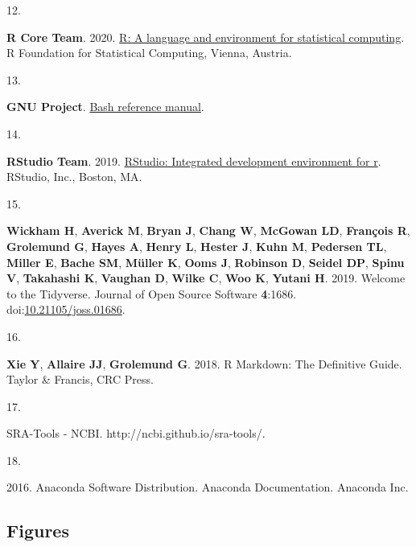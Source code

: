 \documentclass[
]{article}
\newlength{\cslhangindent}
\newlength{\csllabelwidth}
\newlength{\cslentryspacingunit} %
\newenvironment{CSLReferences}[2] %
 {%
  \setlength{\parindent}{0pt}
  \ifodd #1
  \let\oldpar\par
  \def\par{\hangindent=\cslhangindent\oldpar}
  \fi
  \setlength{\parskip}{#2\cslentryspacingunit}
 }%
 {}
\newcommand{\CSLLeftMargin}[1]{\parbox[t]{\csllabelwidth}{#1}}
\newcommand{\CSLRightInline}[1]{\parbox[t]{\linewidth - \csllabelwidth}{#1}\break}
\begin{document}
\begin{CSLReferences}{0}{1}
\leavevmode{}%
\CSLLeftMargin{12. }
\CSLRightInline{\textbf{R Core Team}. 2020.
\href{https://www.R-project.org/}{R: A language and environment for
statistical computing}. R Foundation for Statistical Computing, Vienna,
Austria.}

\leavevmode{}%
\CSLLeftMargin{13. }
\CSLRightInline{\textbf{GNU Project}.
\href{https://www.gnu.org/software/bash/\%20manual/bash.html/}{Bash
reference manual}.}

\leavevmode{}%
\CSLLeftMargin{14. }
\CSLRightInline{\textbf{RStudio Team}. 2019.
\href{http://www.rstudio.com/}{RStudio: Integrated development
environment for r}. RStudio, Inc., Boston, MA.}

\leavevmode{}%
\CSLLeftMargin{15. }
\CSLRightInline{\textbf{Wickham H}, \textbf{Averick M}, \textbf{Bryan
J}, \textbf{Chang W}, \textbf{McGowan LD}, \textbf{François R},
\textbf{Grolemund G}, \textbf{Hayes A}, \textbf{Henry L}, \textbf{Hester
J}, \textbf{Kuhn M}, \textbf{Pedersen TL}, \textbf{Miller E},
\textbf{Bache SM}, \textbf{Müller K}, \textbf{Ooms J}, \textbf{Robinson
D}, \textbf{Seidel DP}, \textbf{Spinu V}, \textbf{Takahashi K},
\textbf{Vaughan D}, \textbf{Wilke C}, \textbf{Woo K}, \textbf{Yutani H}.
2019. Welcome to the Tidyverse. Journal of Open Source Software
\textbf{4}:1686.
doi:\href{https://doi.org/10.21105/joss.01686}{10.21105/joss.01686}.}

\leavevmode{}%
\CSLLeftMargin{16. }
\CSLRightInline{\textbf{Xie Y}, \textbf{Allaire JJ}, \textbf{Grolemund
G}. 2018. R {Markdown}: {The Definitive Guide}. {Taylor \& Francis, CRC
Press}.}

\leavevmode{}%
\CSLLeftMargin{17. }
\CSLRightInline{{SRA}-{Tools} - {NCBI}.
http://ncbi.github.io/sra-tools/.}

\leavevmode{}%
\CSLLeftMargin{18. }
\CSLRightInline{2016. Anaconda {Software Distribution}. Anaconda
Documentation. Anaconda Inc.}

\end{CSLReferences}

\setlength{\parindent}{0in}
\setlength{\leftskip}{0in}

\newpage

\hypertarget{figures}{%
\subsection{Figures}\label{figures}}
\end{document}
